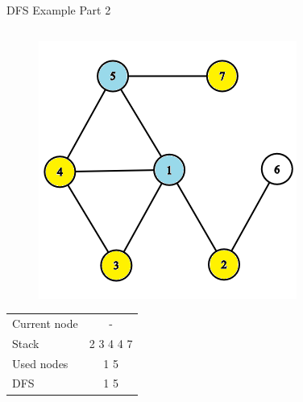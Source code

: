 \documentclass[aspectratio=169]{beamer}%
\begin{document}
\begin{frame}{DFS Example Part 2}
\begin{columns}
\begin{column}{0.32\textwidth}
\begin{figure}[!ht]
                \centering
                \includegraphics[width=0.9\linewidth]{dfs 6.png}
            \end{figure}
            \begin{table}[ht]
                \centering
                \begin{tabular}{l c}
                    Current node & -\\
                    Stack & 2 3 4 4 7\\ 
                    Used nodes & 1 5\\
                    DFS & 1 5
                \end{tabular}
            \end{table}
        \end{column}
    \end{columns}
\end{frame}
\end{document}
